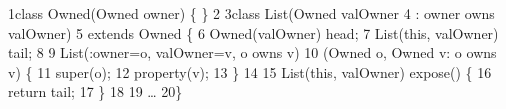 \begin{tightcode}
\quad\num{1}class Owned(Owned owner) \{ \}
\quad\num{2}
\quad\num{3}class List(Owned valOwner
\quad\num{4}         : owner owns valOwner)
\quad\num{5}    extends Owned \{
\quad\num{6}  Owned(valOwner) head;
\quad\num{7}  List(this, valOwner) tail;
\quad\num{8}
\quad\num{9}  List(:owner=o, valOwner=v, o owns v)
\quad\num{10}      (Owned o, Owned v: o owns v) \{
\quad\num{11}    super(o);
\quad\num{12}    property(v);
\quad\num{13}  \}
\quad\num{14}
\quad\num{15}  List(this, valOwner) expose() \{
\quad\num{16}    return tail;
\quad\num{17}  \}
\quad\num{18}
\quad\num{19}  \ldots{}
\quad\num{20}\}
\end{tightcode}
